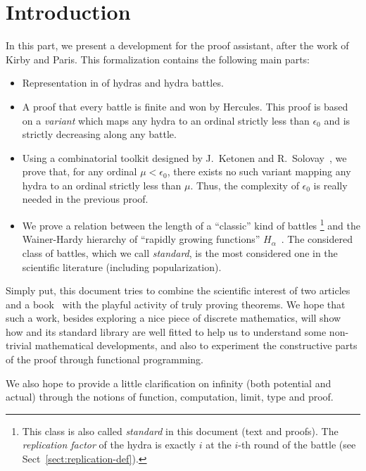 \section*{Introduction}

In this part, we present a development  for the \coq{} proof assistant, after the work of Kirby and Paris. This formalization contains the following main parts:

\begin{itemize}
\item Representation in \coq{} of hydras and hydra battles.
\item A proof that every battle is finite and won by Hercules. This proof is based on a \emph{variant} which maps any hydra to an ordinal strictly less than $\epsilon_0$ and is strictly decreasing along any battle.

\item Using a combinatorial toolkit designed by J.~Ketonen and R.~Solovay~\cite{KS81}, we prove that, for any ordinal $\mu<\epsilon_0$, there exists no such variant mapping any hydra to an ordinal strictly less than $\mu$. Thus, the complexity of $\epsilon_0$ is really needed in the previous proof.

\item We prove a relation between the length of a ``classic''  kind of  battles \footnote{This class is also called \emph{standard} in this document (text and proofs). The \emph{replication factor} of the hydra is exactly $i$ at the $i$-th round of the battle (see Sect~\vref{sect:replication-def}).}
and the Wainer-Hardy hierarchy of ``rapidly growing functions'' $H_\alpha$~\cite{Wainer1970}. The considered class of battles, which we call \emph{standard},  is the most considered one in the scientific  literature (including popularization).
\end{itemize}


Simply put, this document tries to combine the scientific interest of two articles~\cite{KP82, KS81} and a book~\cite{schutte} with the playful activity of truly proving theorems.
We hope  that such a work, besides exploring a nice piece of discrete mathematics,
will show how \coq{} and its standard library are well fitted to help us to understand some non-trivial mathematical developments, and also to experiment the constructive parts of  the proof through functional programming.

 We also hope to provide a little clarification on infinity (both potential and actual) through the notions of function, computation, limit,
 type and proof.



